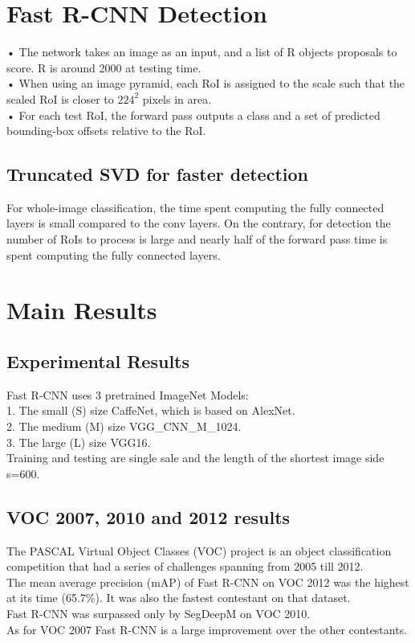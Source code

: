 \documentclass[10pt]{article}
\begin{document}
\section{Fast R-CNN Detection}

•	The network takes an image as an input, and a list of R objects proposals to score.
R is around 2000 at testing time.\\
•	When using an image pyramid, each RoI is assigned to the scale such that the scaled RoI is closer to $224^2$ pixels in area.\\
•	For each test RoI, the forward pass outputs a class and a set of predicted bounding-box offsets relative to the RoI.\\
\subsection{Truncated SVD for faster detection}
For whole-image classification, the time spent computing the fully connected layers is small compared to the conv layers. On the contrary, for detection the number of RoIs to process is large and nearly half of the forward pass time is spent computing the fully connected layers.


\section{Main Results}

\subsection{Experimental Results}
Fast R-CNN uses 3 pretrained ImageNet Models:\\
1. The small (S) size CaffeNet, which is based on AlexNet.\\
2. The medium (M) size VGG\_CNN\_M\_1024.\\
3. The large (L) size VGG16.\\
Training and testing are single sale and the length of the shortest image side s=600.

\subsection{VOC 2007, 2010 and 2012 results}
The PASCAL Virtual Object Classes (VOC) project is an object classification competition that had a series of challenges spanning from 2005 till 2012.\\
The mean average precision (mAP) of Fast R-CNN on VOC 2012 was the highest at its time (65.7\%). It was also the fastest contestant on that dataset.\\
Fast R-CNN was surpassed only by SegDeepM on VOC 2010.\\
As for VOC 2007 Fast R-CNN is a large improvement over the other contestants.
\end{document}
